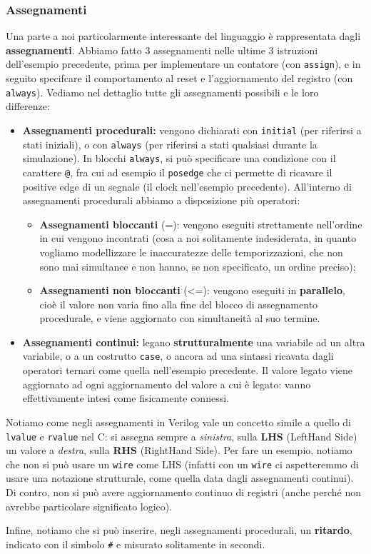 \documentclass[a4paper,11pt]{article}
\begin{document}
\subsubsection{Assegnamenti}
Una parte a noi particolarmente interessante del linguaggio è rappresentata dagli \textbf{assegnamenti}.
Abbiamo fatto 3 assegnamenti nelle ultime 3 istruzioni dell'esempio precedente, prima per implementare un contatore (con \lstinline|assign|), e in seguito specifcare il comportamento al reset e l'aggiornamento del registro (con \lstinline|always|).
Vediamo nel dettaglio tutte gli assegnamenti possibili e le loro differenze:
\begin{itemize}
	\item \textbf{Assegnamenti procedurali:} vengono dichiarati con \lstinline|initial| (per riferirsi a stati iniziali), o con \lstinline|always| (per riferirsi a stati qualsiasi durante la simulazione).
	In blocchi \lstinline|always|, si può specificare una condizione con il carattere \lstinline|@|, fra cui ad esempio il \lstinline|posedge| che ci permette di ricavare il positive edge di un segnale (il clock nell'esempio precedente).
	All'interno di assegnamenti procedurali abbiamo a disposizione più operatori:
	\begin{itemize}
		\item \textbf{Assegnamenti bloccanti} (=): vengono eseguiti strettamente nell'ordine in cui vengono incontrati (cosa a noi solitamente indesiderata, in quanto vogliamo modellizzare le inaccuratezze delle temporizzazioni, che non sono mai simultanee e non hanno, se non specificato, un ordine preciso);
		\item \textbf{Assegnamenti non bloccanti} (<=): vengono eseguiti in \textbf{parallelo}, cioè il valore non varia fino alla fine del blocco di assegnamento procedurale, e viene aggiornato con simultaneità al suo termine.
	\end{itemize}
\item \textbf{Assegnamenti continui:} legano \textbf{strutturalmente} una variabile ad un altra variabile, o a un costrutto \lstinline|case|, o ancora ad una sintassi ricavata dagli operatori ternari come quella nell'esempio precedente. Il valore legato viene aggiornato ad ogni aggiornamento del valore a cui è legato: vanno effettivamente intesi come fisicamente connessi.
\end{itemize}

Notiamo come negli assegnamenti in Verilog vale un concetto simile a quello di \lstinline|lvalue| e \lstinline|rvalue| nel C: si assegna sempre a \textit{sinistra}, sulla \textbf{LHS} (LeftHand Side) un valore a \textit{destra}, sulla \textbf{RHS} (RightHand Side).
Per fare un esempio, notiamo che non si può usare un \lstinline|wire| come LHS (infatti con un \lstinline|wire| ci aspetteremmo di usare una notazione strutturale, come quella data dagli assegnamenti continui).
Di contro, non si può avere aggiornamento continuo di registri (anche perché non avrebbe particolare significato logico).

Infine, notiamo che si può inserire, negli assegnamenti procedurali, un \textbf{ritardo}, indicato con il simbolo \lstinline|#| e misurato solitamente in secondi.
\end{document}
